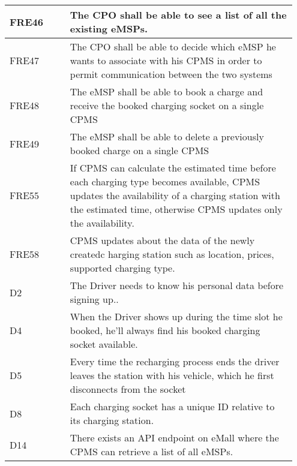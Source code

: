 {\begin{longtable}{|p{0.20\linewidth}p{0.75\linewidth}|}
    \hline
    \rowcolor{bluepoli!15}
    FRE46 & The CPO shall be able to see a list of all the existing eMSPs. \\
    \hline
    \rowcolor{bluepoli!15} FRE47 &  The CPO shall be able to decide which eMSP he wants to associate with his CPMS in order to permit communication between the two systems \\
    \hline
    \rowcolor{bluepoli!15} FRE48 & The eMSP shall be able to book a charge and receive the booked charging socket on a single CPMS \\
    \hline
    \rowcolor{bluepoli!15} FRE49 & The eMSP shall be able to delete a previously booked charge on a single CPMS\\
    \hline
    \rowcolor{bluepoli!15} FRE55 & If CPMS can calculate the estimated time before each charging type becomes available, CPMS updates the availability of a charging station with the estimated time, otherwise CPMS updates only the availability. \\
    \hline
    \rowcolor{bluepoli!15} FRE58 & CPMS updates about the data of the newly createdc harging station such as location, prices, supported charging type. \\
    \hline
    \rowcolor{bluepoli!5} D2 &The Driver needs to know his personal data before signing up.. \\
    \hline 
    \rowcolor{bluepoli!5} D4 & When the Driver shows up during the time slot he booked, he’ll always find his booked charging socket available. \\
    \hline  
    \rowcolor{bluepoli!5} D5 & Every time the recharging process ends the driver leaves the station with his vehicle, which he first disconnects from the socket \\
    \hline  
    \rowcolor{bluepoli!5} D8 & Each charging socket has a unique ID relative to its charging station. \\
    \hline    
    \rowcolor{bluepoli!5} D14 & There exists an API endpoint on eMall where the CPMS can retrieve a list of all eMSPs. \\
    \hline 
\end{longtable}}
